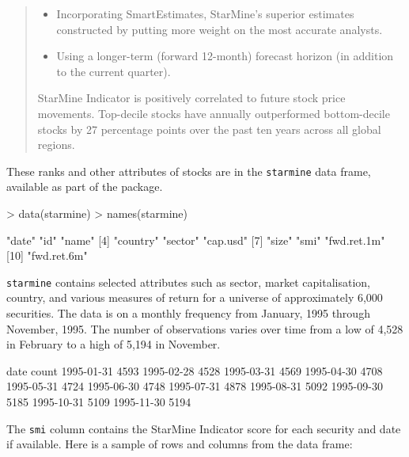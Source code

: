 \documentclass[a4paper]{report}
\begin{document}
\begin{article}
\begin{quote}
\begin{itemize}
\item Incorporating SmartEstimates, StarMine's superior estimates
  constructed by putting more weight on the most accurate analysts.
  
\item Using a longer-term (forward 12-month) forecast horizon (in
  addition to the current quarter).

\end{itemize}

StarMine Indicator is positively correlated to future stock price
movements. Top-decile stocks have annually outperformed bottom-decile
stocks by 27 percentage points over the past ten years across all
global regions.
\end{quote}

\normalsize

These ranks and other attributes of stocks are in the
\texttt{starmine} data frame, available as part of the
 package.


\begin{Schunk}
\begin{Sinput}
> data(starmine)
> names(starmine)
\end{Sinput}
\begin{Soutput}
 [1] "date"       "id"         "name"      
 [4] "country"    "sector"     "cap.usd"   
 [7] "size"       "smi"        "fwd.ret.1m"
[10] "fwd.ret.6m"
\end{Soutput}
\end{Schunk}

\texttt{starmine} contains selected attributes such as sector, market
capitalisation, country, and various measures of return for a universe
of approximately 6,000 securities.  The data is on a monthly frequency
from January, 1995 through November, 1995.  The number of observations
varies over time from a low of 4,528 in February to a high of 5,194 in
November.

\begin{Schunk}
\begin{Soutput}
      date count
1995-01-31  4593
1995-02-28  4528
1995-03-31  4569
1995-04-30  4708
1995-05-31  4724
1995-06-30  4748
1995-07-31  4878
1995-08-31  5092
1995-09-30  5185
1995-10-31  5109
1995-11-30  5194
\end{Soutput}
\end{Schunk}

The \texttt{smi} column contains the StarMine Indicator score for each
security and date if available.  Here is a sample of rows
and columns from the data frame:



\end{article}
\end{document}
